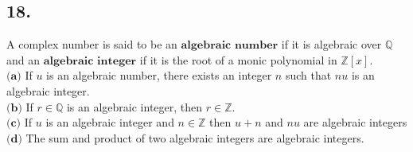 \documentclass[a4paper, 11pt]{article}
\begin{document}
 \subsection*{18.}
 A complex number is said to be an $\textbf{algebraic number}$ if it is algebraic over $\mathbb{Q}$ and an 
 $\textbf{algebraic integer}$ if it is the root of a monic polynomial in $\mathbb{Z}[x]$.\\
 \indent $\textbf{(a)}$ If $u$ is an algebraic number, there exists an integer $n$ such that $nu$ is an algebraic
 integer.\\
 \indent $\textbf{(b)}$ If $r\in \mathbb{Q}$ is an algebraic integer, then $r\in \mathbb{Z}$.\\
 \indent $\textbf{(c)}$ If $u$ is an algebraic integer and $n\in\mathbb{Z}$ then $u+n$ and $nu$ are algebraic 
 integers\\
 \indent $\textbf{(d)}$ The sum and product of two algebraic integers are algebraic integers.
\end{document}
